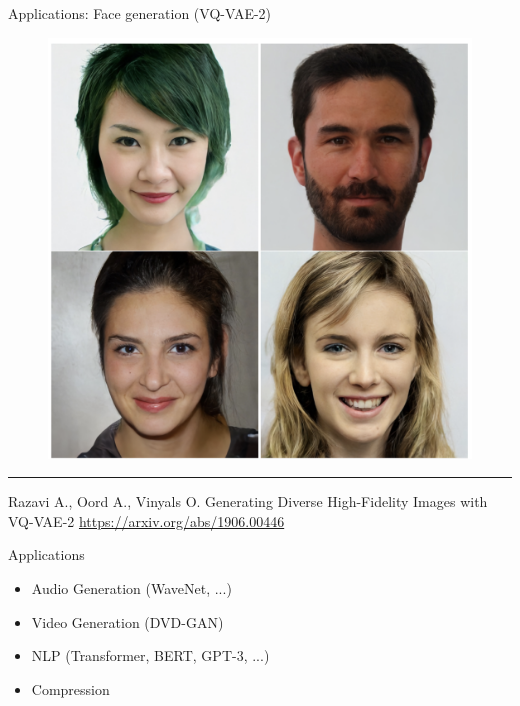 \documentclass{beamer}
\begin{document}
\begin{frame}{Applications: Face generation (VQ-VAE-2)}
    \begin{figure}
        \centering
        \includegraphics[width=0.65\linewidth]{figs/vq_vae.png}
        \label{fig:vq_vae}
    \end{figure}
\vfill
\hrule\medskip
{\scriptsize Razavi A., Oord A., Vinyals O. Generating Diverse High-Fidelity Images with VQ-VAE-2 \href{https://arxiv.org/abs/1906.00446}{https://arxiv.org/abs/1906.00446}}
\end{frame}
\begin{frame}{Applications}
\begin{itemize}
    \item Audio Generation (WaveNet, ...)
    \item Video Generation (DVD-GAN)
    \item NLP (Transformer, BERT, GPT-3, ...)
    \item Compression
\end{itemize}
\end{frame}
\end{document}
